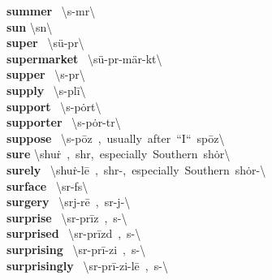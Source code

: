 \documentclass[10pt,a4paper]{article}
\begin{document}
\begin{multicols}{2}
\textbf{ summer }\quad \ \textbackslash \textprimstress s\textschwa -m\textschwa r\textbackslash \\
\textbf{ sun }\quad \textbackslash \textprimstress s\textschwa n\textbackslash \\
\textbf{ super }\quad \ \textbackslash \textprimstress s\"{u}-p\textschwa r\textbackslash \\
\textbf{ supermarket }\quad \ \textbackslash \textprimstress s\"{u}-p\textschwa r-\textsecstress m\"{a}r-k\textschwa t\textbackslash \\
\textbf{ supper }\quad \ \textbackslash \textprimstress s\textschwa -p\textschwa r\textbackslash \\
\textbf{ supply }\quad \ \textbackslash s\textschwa -\textprimstress pl\={i}\textbackslash \\
\textbf{ support }\quad \ \textbackslash s\textschwa -\textprimstress p\.{o}rt\textbackslash \\
\textbf{ supporter }\quad \ \textbackslash s\textschwa -\textprimstress p\.{o}r-t\textschwa r\textbackslash \\
\textbf{ suppose }\quad \ \textbackslash s\textschwa -\textprimstress p\={o}z\ ,\ usually\ after\ ``I``\ \textprimstress sp\={o}z\textbackslash \\
\textbf{ sure }\quad \textbackslash \textprimstress shu\. r\ ,\ \textprimstress sh\textschwa r,\ especially\ Southern\ \textprimstress sh\.{o}r\textbackslash \\
\textbf{ surely }\quad \ \textbackslash \textprimstress shu\. r-l\={e}\ ,\ \textprimstress sh\textschwa r-,\ especially\ Southern\ \textprimstress sh\.{o}r-\textbackslash \\
\textbf{ surface }\quad \ \textbackslash \textprimstress s\textschwa r-f\textschwa s\textbackslash \\
\textbf{ surgery }\quad \ \textbackslash \textprimstress s\textschwa rj-r\={e}\ ,\ \textprimstress s\textschwa r-j\textschwa -\textbackslash \\
\textbf{ surprise }\quad \ \textbackslash s\textschwa r-\textprimstress pr\={i}z\ ,\ s\textschwa -\textbackslash \\
\textbf{ surprised }\quad \ \textbackslash s\textschwa r-\textprimstress pr\={i}zd\ ,\ s\textschwa -\textbackslash \\
\textbf{ surprising }\quad \ \textbackslash s\textschwa r-\textprimstress pr\={i}-zi\engma \ ,\ s\textschwa -\textbackslash \\
\textbf{ surprisingly }\quad \ \textbackslash s\textschwa r-\textprimstress pr\={i}-zi\engma -l\={e}\ ,\ s\textschwa -\textbackslash \\

\end{multicols}
\end{document}

